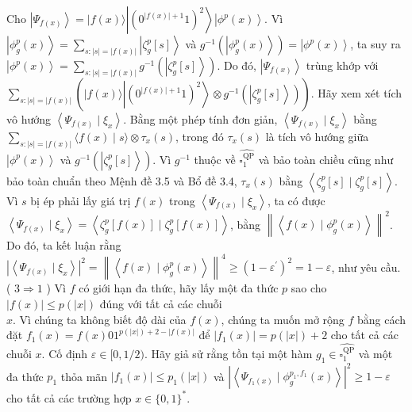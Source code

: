 \documentclass[10pt]{article}
\begin{document}
Cho $\left|\Psi_{f(x)}\right\rangle=|f(x)\rangle\left|\left(0^{|f(x)|+1} 1\right)^{2}\right\rangle\left|\phi^{p}(x)\right\rangle$. Vì $\left|\phi_{g}^{p}(x)\right\rangle=\sum_{s:|s|=|f(x)|}\left|\zeta_{g}^{p}[s]\right\rangle$ và $g^{-1}\left(\left|\phi_{g}^{p}(x)\right\rangle\right)= \left|\phi^{p}(x)\right\rangle$, ta suy ra $\left|\phi^{p}(x)\right\rangle=\sum_{s:|s|=|f(x)|} g^{-1}\left(\left|\zeta_{g}^{p}[s]\right\rangle\right)$. Do đó, $\left|\Psi_{f(x)}\right\rangle$ trùng khớp với $\sum_{s:|s|=|f(x)|}\left(|f(x)\rangle\left|\left(0^{|f(x)|+1} 1\right)^{2}\right\rangle \otimes g^{-1}\left(\left|\zeta_{g}^{p}[s]\right\rangle\right)\right)$. Hãy xem xét tích vô hướng $\left\langle\Psi_{f(x)} \mid \xi_{x}\right\rangle$. Bằng một phép tính đơn giản, $\left\langle\Psi_{f(x)} \mid \xi_{x}\right\rangle$ bằng $\sum_{s:|s|=|f(x)|}\langle f(x) \mid s\rangle \otimes \tau_{x}(s)$, trong đó $\tau_{x}(s)$ là tích vô hướng giữa $\left|\phi^{p}(x)\right\rangle$ và $g^{-1}\left(\left|\zeta_{g}^{p}[s]\right\rangle\right)$. Vì $g^{-1}$ thuộc về $\widehat{\square_{1}^{\mathrm{QP}}}$ và bảo toàn chiều cũng như bảo toàn chuẩn theo Mệnh đề 3.5 và Bổ đề 3.4, $\tau_{x}(s)$ bằng $\left\langle\zeta_{g}^{p}[s] \mid \zeta_{g}^{p}[s]\right\rangle$. Vì $s$ bị ép phải lấy giá trị $f(x)$ trong $\left\langle\Psi_{f(x)} \mid \xi_{x}\right\rangle$, ta có được $\left\langle\Psi_{f(x)} \mid \xi_{x}\right\rangle=\left\langle\zeta_{g}^{p}[f(x)] \mid \zeta_{g}^{p}[f(x)]\right\rangle$, bằng $\left\|\left\langle f(x) \mid \phi_{g}^{p}(x)\right\rangle\right\|^{2}$. Do đó, ta kết luận rằng $\left|\left\langle\Psi_{f(x)} \mid \xi_{x}\right\rangle\right|^{2}=\left\|\left\langle f(x) \mid \phi_{g}^{p}(x)\right\rangle\right\|^{4} \geq\left(1-\varepsilon^{\prime}\right)^{2}=1-\varepsilon$, như yêu cầu.\\
( $3 \Rightarrow 1$ ) Vì $f$ có giới hạn đa thức, hãy lấy một đa thức $p$ sao cho $|f(x)| \leq p(|x|)$ đúng với tất cả các chuỗi\\
$x$. Vì chúng ta không biết độ dài của $f(x)$, chúng ta muốn mở rộng $f$ bằng cách đặt $f_{1}(x)=f(x) 01^{p(|x|)+2-|f(x)|}$ để $\left|f_{1}(x)\right|=p(|x|)+2$ cho tất cả các chuỗi $x$. Cố định $\varepsilon \in[0,1 / 2)$. Hãy giả sử rằng tồn tại một hàm $g_{1} \in \widehat{\square_{1}^{\mathrm{QP}}}$ và một đa thức $p_{1}$ thỏa mãn $\left|f_{1}(x)\right| \leq p_{1}(|x|)$ và $\left|\left\langle\Psi_{f_{1}(x)} \mid \phi_{g}^{p_{1}, f_{1}}(x)\right\rangle\right|^{2} \geq 1-\varepsilon$ cho tất cả các trường hợp $x \in\{0,1\}^{*}$.
\end{document}
